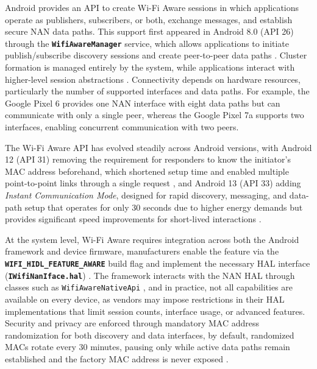 \quad Android provides an API to create Wi-Fi Aware sessions in which applications operate as publishers, subscribers, or both, exchange messages, and establish secure NAN data paths. This support first appeared in Android 8.0 (API 26) through the \textbf{\texttt{WifiAwareManager}} service, which allows applications to initiate publish/subscribe discovery sessions and create peer-to-peer data paths \cite{android_wifi_aware_overview}. Cluster formation is managed entirely by the system, while applications interact with higher-level session abstractions \cite{android_wifi_aware_overview}. Connectivity depends on hardware resources, particularly the number of supported interfaces and data paths. For example, the Google Pixel 6 provides one NAN interface with eight data paths but can communicate with only a single peer, whereas the Google Pixel 7a supports two interfaces, enabling concurrent communication with two peers.

\quad The Wi-Fi Aware API has evolved steadily across Android versions, with Android 12 (API 31) removing the requirement for responders to know the initiator’s MAC address beforehand, which shortened setup time and enabled multiple point-to-point links through a single request \cite{android_wifi_aware_overview}, and Android 13 (API 33) adding \textit{Instant Communication Mode}, designed for rapid discovery, messaging, and data-path setup that operates for only 30 seconds due to higher energy demands but provides significant speed improvements for short-lived interactions \cite{android_wifi_aware_overview}.

\quad At the system level, Wi-Fi Aware requires integration across both the Android framework and device firmware, manufacturers enable the feature via the \textbf{\texttt{WIFI\_HIDL\_FEATURE\_AWARE}} build flag and implement the necessary HAL interface (\textbf{\texttt{IWifiNanIface.hal}}) \cite{android_wifi_aware_hal}. The framework interacts with the NAN HAL through classes such as \texttt{WifiAwareNativeApi} \cite{android_wifi_aware_hal}, and in practice, not all capabilities are available on every device, as vendors may impose restrictions in their HAL implementations that limit session counts, interface usage, or advanced features. Security and privacy are enforced through mandatory MAC address randomization for both discovery and data interfaces, by default, randomized MACs rotate every 30 minutes, pausing only while active data paths remain established and the factory MAC address is never exposed \cite{android_wifi_aware_source}.

